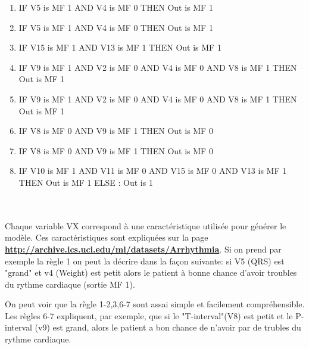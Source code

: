 \begin{enumerate}
\item  IF V5 is MF 1 AND V4 is MF 0 THEN Out is MF 1
\item  IF V5 is MF 1 AND V4 is MF 0 THEN Out is MF 1
\item  IF V15 is MF 1 AND V13 is MF 1 THEN Out is MF 1
\item  IF V9 is MF 1 AND V2 is MF 0 AND V4 is MF 0 AND V8 is MF 1 THEN Out is MF 1
\item IF V9 is MF 1 AND V2 is MF 0 AND V4 is MF 0 AND V8 is MF 1 THEN Out is MF 1
\item IF V8 is MF 0 AND V9 is MF 1 THEN Out is MF 0
\item IF V8 is MF 0 AND V9 is MF 1 THEN Out is MF 0
\item IF V10 is MF 1 AND V11 is MF 0 AND V15 is MF 0 AND V13 is MF 1 THEN Out is MF 1 ELSE : Out is 1  
\end{enumerate}\\
\\
Chaque variable VX correspond à une caractéristique utilisée pour générer le modèle. Ces caractéristiques sont expliquées sur la page \textbf{\url{http://archive.ics.uci.edu/ml/datasets/Arrhythmia}}.
Si on prend par exemple la règle 1 on peut la décrire dans la façon suivante: si V5 (QRS) est "grand"  et v4 (Weight) est petit alors le patient à bonne chance d'avoir troubles du rythme cardiaque (sortie MF 1).

On peut voir que la règle 1-2,3,6-7 sont assai simple et facilement compréhensible. 
Les règles 6-7 expliquent, par exemple, que si le "T-interval"(V8) est petit et le P-interval (v9) est grand, alors le patient a bon chance de n'avoir par de trubles du rythme cardiaque.


 
 
 
 
 
 

